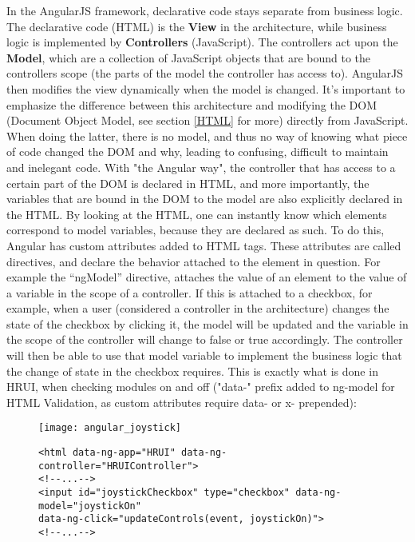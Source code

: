 In the AngularJS framework, declarative code stays separate from business logic. The declarative code (HTML) is the \textbf{View} in the
architecture, while business logic is implemented by \textbf{Controllers} (JavaScript). The controllers act upon the \textbf{Model},
which are a collection of JavaScript objects that are bound to the controllers scope (the parts of the model the controller has access
to). AngularJS then modifies the view dynamically when the model is changed. It's important to emphasize the difference between this
architecture and modifying the DOM (Document Object Model, see section \ref{HTML} for more) directly from JavaScript. When doing the
latter, there is no model, and thus no way of knowing what piece of code changed the DOM and why, leading to confusing, difficult to
maintain and inelegant code. With "the Angular way", the controller that has access to a certain part of the DOM is declared in HTML,
and more importantly, the variables that are bound in the DOM to the model are also explicitly declared in the HTML. By looking at the
HTML, one can instantly know which elements correspond to model variables, because they are declared as such. To do this, Angular has
custom attributes added to HTML tags. These attributes are called directives, and declare the behavior attached to the element in
question. For example the ``ngModel'' directive, attaches the value of an element to the value of a variable in the scope of a
controller. If this is attached to a checkbox, for example, when a user (considered a controller in the architecture) changes the state
of the checkbox by clicking it, the model will be updated and the variable in the scope of the controller will change to false or true
accordingly. The controller will then be able to use that model variable to implement the business logic that the change of state in the
checkbox requires. This is exactly what is done in HRUI, when checking modules on and off ("data-" prefix added to ng-model for HTML
Validation, as custom attributes require data- or x- prepended):
\begin{figure}[H]
  \captionsetup{justification=centering}
  \begin{center}
    \texttt{[image: angular\_joystick]}
  \end{center}
\end{figure}
\begin{figure}[H]
\centering
\captionsetup{justification=centering}
\begin{verbatim}
<html data-ng-app="HRUI" data-ng-controller="HRUIController">
<!--...-->
<input id="joystickCheckbox" type="checkbox" data-ng-model="joystickOn"
data-ng-click="updateControls(event, joystickOn)">
<!--...-->
\end{verbatim}
\end{figure}
